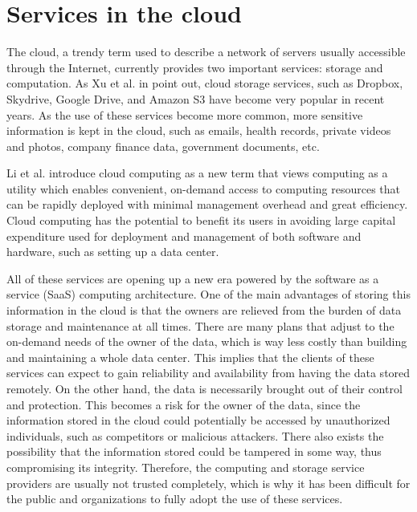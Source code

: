 \section{Services in the cloud}

The cloud, a trendy term used to describe a network of servers usually accessible through the Internet, currently provides two important services: storage and computation. As Xu et al. in \cite{cryptoeprint:2011:574} point out, cloud storage services, such as Dropbox, Skydrive, Google Drive, and Amazon S3 have become very popular in recent years. As the use of these services become more common, more sensitive information is kept in the cloud, such as emails, health records, private videos and photos, company finance data, government documents, etc. 

Li et al. \cite{cryptoeprint:2009:593} introduce cloud computing as a new term that views computing as a utility which enables convenient, on-demand access to computing resources that can be rapidly deployed with minimal management overhead and great efficiency. Cloud computing has the potential to benefit its users in avoiding large capital expenditure used for deployment and management of both software and hardware, such as setting up a data center. 

All of these services are opening up a new era powered by the software as a service (SaaS) computing architecture. One of the main advantages of storing this information in the cloud is that the owners are relieved from the burden of data storage and maintenance at all times. There are many plans that adjust to the on-demand needs of the owner of the data, which is way less costly than building and maintaining a whole data center. This implies that the clients of these services can expect to gain reliability and availability from having the data stored remotely. On the other hand, the data is necessarily brought out of their control and protection. This becomes a risk for the owner of the data, since the information stored in the cloud could potentially be accessed by unauthorized individuals, such as competitors or malicious attackers. There also exists the possibility that the information stored could be tampered in some way, thus compromising its integrity. Therefore, the computing and storage service providers are usually not trusted completely, which is why it has been difficult for the public and organizations to fully adopt the use of these services.

